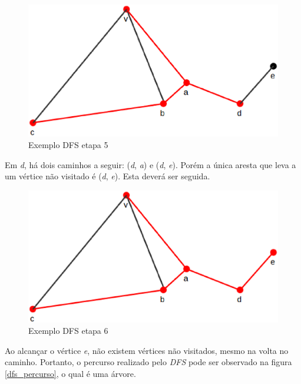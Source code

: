 \begin{apendicesenv}
\begin{figure}[!h]
	\centering
	\includegraphics[scale=0.25]{figuras/capitulo2/dfs/dfs5.eps}
	\caption[Exemplo DFS etapa 5]{Exemplo DFS etapa 5 \cite{Cormen:2001}}
	\label{dfs5}
\end{figure}

Em \textit{d}, há dois caminhos a seguir: (\textit{d}, \textit{a}) e (\textit{d}, \textit{e}). Porém a única aresta que leva a um vértice não visitado é (\textit{d}, \textit{e}). Esta deverá ser seguida.

\begin{figure}[!h]
	\centering
	\includegraphics[scale=0.25]{figuras/capitulo2/dfs/dfs6.eps}
	\caption[Exemplo DFS etapa 6]{Exemplo DFS etapa 6 \cite{Cormen:2001}}
	\label{dfs6}
\end{figure}

Ao alcançar o vértice \textit{e}, não existem vértices não visitados, mesmo na volta no caminho. Portanto, o percurso realizado pelo \textit{DFS} pode ser observado na figura \ref{dfs_percurso}, o qual é uma árvore.


\end{apendicesenv}
